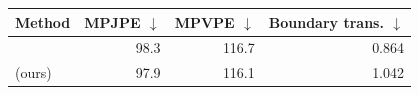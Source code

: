 \begin{tabular}{lrrr}
\toprule
Method & MPJPE $\downarrow$ & MPVPE $\downarrow$ & Boundary trans. $\downarrow$ \\
\midrule
\humanthree{} & 98.3 & 116.7 & 0.864 \\
\method{} (ours) & 97.9 & 116.1 & 1.042 \\
\bottomrule
\end{tabular}
